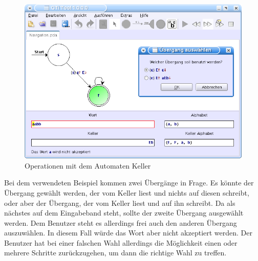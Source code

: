 \begin{figure}[h!]
\begin{center}
\includegraphics[width=12cm]{../images/grammar_pda.png}
\caption{Operationen mit dem Automaten Keller}
\end{center}
\end{figure}
\vspace{10pt}

Bei dem verwendeten Beispiel kommen zwei Übergänge in Frage. Es könnte der
Übergang gewählt werden, der  vom Keller liest und nichts auf diesen
schreibt, oder aber der Übergang, der  vom Keller liest und
 auf ihn schreibt. Da  als nächstes auf
dem Eingabeband steht, sollte der zweite Übergang ausgewählt werden. Dem Benutzer
steht es allerdings frei auch den anderen Übergang auszuwählen. In diesem Fall
würde das Wort  aber nicht akzeptiert
werden. Der Benutzer hat bei einer falschen Wahl allerdings die Möglichkeit einen
oder mehrere Schritte zurückzugehen, um dann die richtige Wahl zu
treffen.\vspace{10pt}
